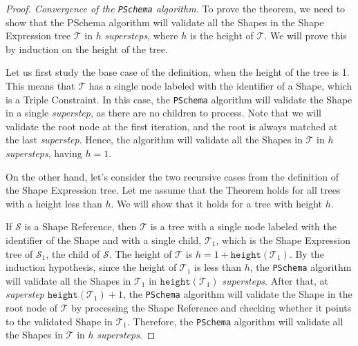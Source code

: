 \begin{proof}[Proof. Convergence of the \texttt{PSchema} algorithm]
    To prove the theorem, we need to show that the PSchema algorithm will validate all the Shapes in the Shape Expression tree $\mathcal{T}$ in $h$ \textit{supersteps}, where $h$ is the height of $\mathcal{T}$. We will prove this by induction on the height of the tree.

    Let us first study the base case of the definition, when the height of the tree is 1. This means that $\mathcal{T}$ has a single node labeled with the identifier of a Shape, which is a Triple Constraint. In this case, the \texttt{PSchema} algorithm will validate the Shape in a single \textit{superstep}, as there are no children to process. Note that we will validate the root node at the first iteration, and the root is always matched at the last \textit{superstep}. Hence, the algorithm will validate all the Shapes in $\mathcal{T}$ in $h$ \textit{supersteps}, having $h = 1$.

    On the other hand, let's consider the two recursive cases from the definition of the Shape Expression tree. Let me assume that the Theorem holds for all trees with a height less than $h$. We will show that it holds for a tree with height $h$.

    If $\mathcal{S}$ is a Shape Reference, then $\mathcal{T}$ is a tree with a single node labeled with the identifier of the Shape and with a single child, $\mathcal{T}_1$, which is the Shape Expression tree of $\mathcal{S}_1$, the child of $\mathcal{S}$. The height of $\mathcal{T}$ is $h = 1 + \texttt{height}(\mathcal{T}_1)$. By the induction hypothesis, since the height of $\mathcal{T}_1$ is less than $h$, the \texttt{PSchema} algorithm will validate all the Shapes in $\mathcal{T}_1$ in $\texttt{height}(\mathcal{T}_1)$ \textit{supersteps}. After that, at \textit{superstep} $\texttt{height}(\mathcal{T}_1) + 1$, the \texttt{PSchema} algorithm will validate the Shape in the root node of $\mathcal{T}$ by processing the Shape Reference and checking whether it points to the validated Shape in $\mathcal{T}_1$. Therefore, the \texttt{PSchema} algorithm will validate all the Shapes in $\mathcal{T}$ in $h$ \textit{supersteps}.


\end{proof}
